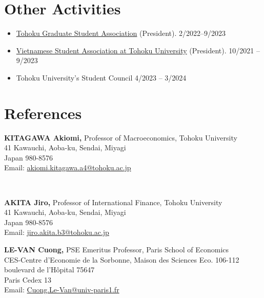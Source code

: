 \documentclass[margin,line]{res}
\begin{document}
\begin{resume}
\section{\sc Other Activities}
\begin{itemize}
\item[] \href{https://inseikaitohoku.org/}{Tohoku Graduate Student Association} (President).  \hfill 2/2022--9/2023
\item[] \href{https://vsatohoku.wordpress.com/}{Vietnamese Student Association at Tohoku University} (President).  \hfill 10/2021 -- 9/2023
\item[] Tohoku University's Student Council \hfill 4/2023 -- 3/2024
\end{itemize}


\section{\sc References}
\vspace*{.05in}
\parbox{\textwidth}{
{\bf KITAGAWA Akiomi,} Professor of Macroeconomics, Tohoku University \\
41 Kawauchi, Aoba-ku, Sendai, Miyagi \\
Japan 980-8576 \\
Email: \href{mailto:akiomi.kitagawa.a4@tohoku.ac.jp}{akiomi.kitagawa.a4@tohoku.ac.jp}} \\

\par
\parbox{\textwidth}{
{\bf AKITA Jiro,} Professor of International Finance, Tohoku University\\
41 Kawauchi, Aoba-ku, Sendai, Miyagi \\
Japan 980-8576 \\
Email: \href{mailto:jiro.akita.b3@tohoku.ac.jp}{jiro.akita.b3@tohoku.ac.jp}}

\par
\parbox{\textwidth}{
{\bf LE-VAN Cuong,} PSE Emeritus Professor, Paris School of Economics\\
CES-Centre d'Economie de la Sorbonne, Maison des Sciences Eco. 106-112 boulevard de l'Hôpital 75647 \\
Paris Cedex 13 \\
Email: \href{mailto:Cuong.Le-Van@univ-paris1.fr}{Cuong.Le-Van@univ-paris1.fr}}


\end{resume}
\end{document}
